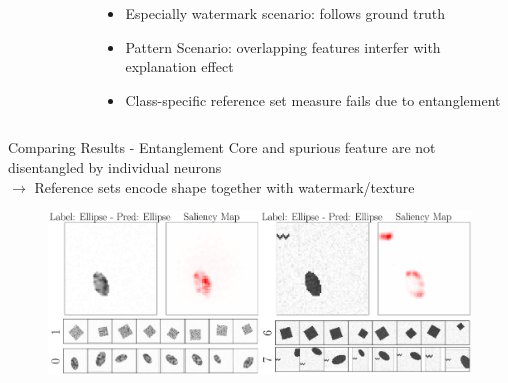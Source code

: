 \documentclass[German, aspectratio=169]{beamer}
\begin{document}
\begin{frame}
\begin{columns}
\begin{column}[t]{0.3\textwidth}
\begin{figure}[t!]
            \end{figure}
        \end{column}
        \begin{column}[t]{0.6\textwidth}
            \begin{itemize}
                \item Especially watermark scenario: follows ground truth
                \item Pattern Scenario: overlapping features interfer with explanation effect \pause
                \item Class-specific reference set measure fails due to entanglement
            \end{itemize}
        \end{column}
    \end{columns}
\end{frame}

\begin{frame}[t,noframenumbering]{Comparing Results - Entanglement}
    Core and spurious feature are not disentangled by individual neurons\\
    $\rightarrow$ Reference sets encode shape together with watermark/texture
    \begin{figure}[ht!]
        \centering
        \includegraphics[width=\textwidth]{images/no_disentanglement.png}
        \label{fig:no_disentanglement}
    \end{figure}
\end{frame}

\end{document}
